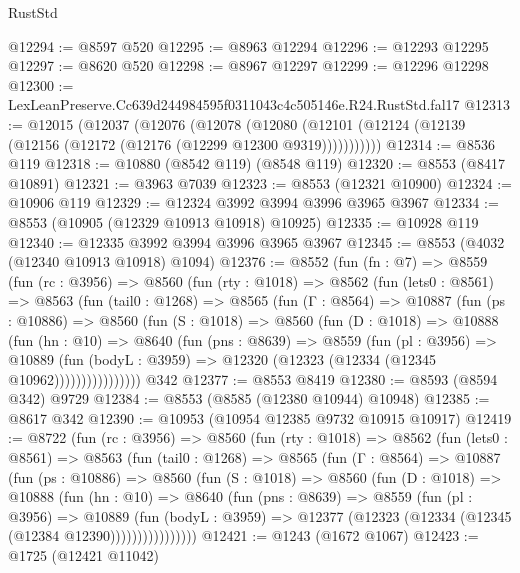 \begin{lexlean}{RustStd}
\begin{coremodule}
@12294 := @8597 @520
@12295 := @8963 @12294
@12296 := @12293 @12295
@12297 := @8620 @520
@12298 := @8967 @12297
@12299 := @12296 @12298
@12300 := LexLeanPreserve.Cc639d244984595f0311043c4c505146e.R24.RustStd.fal17
@12313 := @12015
    (@12037
      (@12076
        (@12078
          (@12080 (@12101 (@12124 (@12139 (@12156 (@12172 (@12176 (@12299 @12300 @9319)))))))))))
@12314 := @8536 @119
@12318 := @10880 (@8542 @119) (@8548 @119)
@12320 := @8553 (@8417 @10891)
@12321 := @3963 @7039
@12323 := @8553 (@12321 @10900)
@12324 := @10906 @119
@12329 := @12324 @3992 @3994 @3996 @3965 @3967
@12334 := @8553 (@10905 (@12329 @10913 @10918) @10925)
@12335 := @10928 @119
@12340 := @12335 @3992 @3994 @3996 @3965 @3967
@12345 := @8553 (@4032 (@12340 @10913 @10918) @1094)
@12376 := @8552
    (fun (fn : @7) =>
    @8559
      (fun (rc : @3956) =>
      @8560
        (fun (rty : @1018) =>
        @8562
          (fun (lets0 : @8561) =>
          @8563
            (fun (tail0 : @1268) =>
            @8565
              (fun (Γ : @8564) =>
              @10887
                (fun (ps : @10886) =>
                @8560
                  (fun (S : @1018) =>
                  @8560
                    (fun (D : @1018) =>
                    @10888
                      (fun (hn : @10) =>
                      @8640
                        (fun (pns : @8639) =>
                        @8559
                          (fun (pl : @3956) =>
                          @10889
                            (fun (bodyL : @3959) =>
                            @12320 (@12323 (@12334 (@12345 @10962))))))))))))))))
    @342
@12377 := @8553 @8419
@12380 := @8593 (@8594 @342) @9729
@12384 := @8553 (@8585 (@12380 @10944) @10948)
@12385 := @8617 @342
@12390 := @10953 (@10954 @12385 @9732 @10915 @10917)
@12419 := @8722
    (fun (rc : @3956) =>
    @8560
      (fun (rty : @1018) =>
      @8562
        (fun (lets0 : @8561) =>
        @8563
          (fun (tail0 : @1268) =>
          @8565
            (fun (Γ : @8564) =>
            @10887
              (fun (ps : @10886) =>
              @8560
                (fun (S : @1018) =>
                @8560
                  (fun (D : @1018) =>
                  @10888
                    (fun (hn : @10) =>
                    @8640
                      (fun (pns : @8639) =>
                      @8559
                        (fun (pl : @3956) =>
                        @10889
                          (fun (bodyL : @3959) =>
                          @12377 (@12323 (@12334 (@12345 (@12384 @12390))))))))))))))))
@12421 := @1243 (@1672 @1067)
@12423 := @1725 (@12421 @11042)

\end{coremodule}
\end{lexlean}
